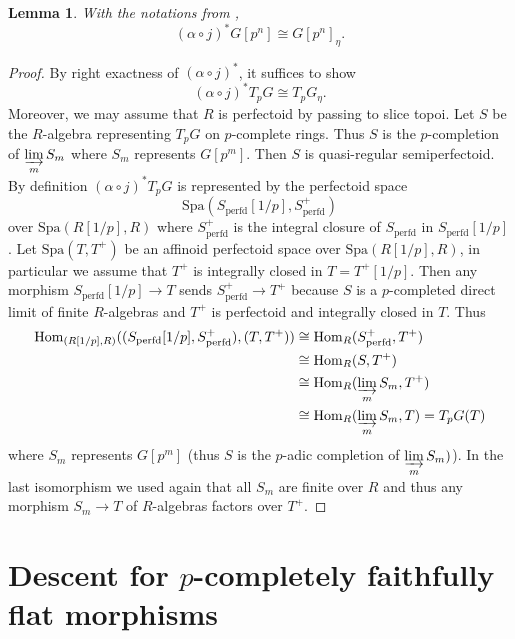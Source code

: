 \documentclass{amsart}
\theoremstyle{plain}
\newtheorem{lemma}[theorem]{Lemma}
\theoremstyle{definition}
\newcommand{\Spa}{\mathrm{Spa}}
\begin{document}
\begin{lemma}
  \label{sec:etale-comparison-p-1-pullback-of-finite-flat-group-scheme}
  With the notations from ,
  $$
  (\alpha\circ j)^\ast G[p^n]\cong G[p^n]_\eta.
  $$
\end{lemma}
\begin{proof}
  By right exactness of $(\alpha\circ j)^\ast$, it suffices to show
  $$
  (\alpha\circ j)^\ast T_pG\cong T_pG_{\eta}.
  $$
  Moreover, we may assume that $R$ is perfectoid by passing to slice topoi. Let $S$ be the $R$-algebra representing $T_pG$ on $p$-complete rings. Thus $S$ is the $p$-completion of $\varinjlim\limits_m S_m$ where $S_m$ represents $G[p^m]$. Then $S$ is quasi-regular semiperfectoid. By definition $(\alpha\circ j)^{\ast}T_pG$ is represented by the perfectoid space
  $$
  \Spa(S_{\mathrm{perfd}}[1/p],S_{\mathrm{perfd}}^+)
  $$
  over $\Spa(R[1/p],R)$
  where $S_{\mathrm{perfd}}^+$ is the integral closure of $S_{\mathrm{perfd}}$ in $S_{\mathrm{perfd}}[1/p]$. Let $\Spa(T,T^+)$ be an affinoid perfectoid space over $\Spa(R[1/p],R)$, in particular we assume that $T^+$ is integrally closed in $T=T^+[1/p]$. Then any morphism $S_{\mathrm{perfd}}[1/p]\to T$ sends $S_{\mathrm{perfd}}^+\to T^+$ because $S$ is a $p$-completed direct limit of finite $R$-algebras and $T^+$ is perfectoid and integrally closed in $T$. Thus
\begin{equation*}
  \begin{split}  
    \mathrm{Hom}_{(R[1/p],R)}((S_{\mathrm{perfd}}[1/p],S_{\mathrm{perfd}}^+),(T,T^+)) & \cong  \mathrm{Hom}_{R}(S_{\mathrm{perfd}}^+,T^+) \\
  &  \cong  \mathrm{Hom}_R(S,T^+) \\
   & \cong  \mathrm{Hom}_R(\varinjlim\limits_m S_m,T^+) \\
   & \cong  \mathrm{Hom}_R(\varinjlim\limits_m S_m,T)=T_pG(T)
 \end{split}
\end{equation*}
  where $S_m$ represents $G[p^m]$ (thus $S$ is the $p$-adic completion of $\varinjlim\limits_m S_m)$). In the last isomorphism we used again that all $S_m$ are finite over $R$ and thus any morphism $S_m\to T$ of $R$-algebras factors over $T^+$.
\end{proof}


\newpage
\appendix
\section{Descent for $p$-completely faithfully flat morphisms}
\label{sec:descent-p-completely}
\end{document}
